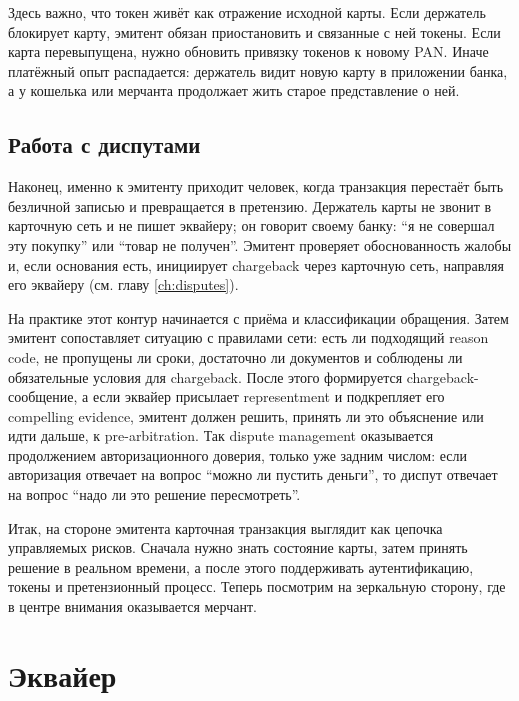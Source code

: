 Здесь важно, что токен живёт как отражение исходной карты.
Если держатель блокирует карту, эмитент обязан
приостановить и связанные с ней токены. Если карта перевыпущена,
нужно обновить привязку токенов к новому PAN. Иначе платёжный
опыт распадается: держатель видит новую карту в приложении банка,
а у кошелька или мерчанта продолжает жить старое представление
о ней.\cite{emvco-payment-tokenisation,visa-vts}

\subsection*{Работа с диспутами}

Наконец, именно к эмитенту приходит человек, когда транзакция
перестаёт быть безличной записью и превращается в претензию.
Держатель карты не звонит в карточную сеть и не пишет эквайеру;
он говорит своему банку: \enquote{я не совершал эту покупку}
или \enquote{товар не получен}. Эмитент проверяет обоснованность
жалобы и, если основания есть, инициирует chargeback через
карточную сеть, направляя его эквайеру
(см. главу \ref{ch:disputes}).\cite{visa-dispute-rules,mc-chargeback-guide,visa-vcr-merchants}

На практике этот контур начинается с приёма и классификации
обращения. Затем эмитент сопоставляет ситуацию с правилами сети:
есть ли подходящий reason code, не пропущены ли сроки, достаточно
ли документов и соблюдены ли обязательные условия для chargeback.
После этого формируется chargeback-сообщение, а если эквайер
присылает representment и подкрепляет его compelling evidence,
эмитент должен решить, принять ли это объяснение или идти дальше,
к pre-arbitration. Так dispute management оказывается продолжением
авторизационного доверия, только уже задним числом: если
авторизация отвечает на вопрос \enquote{можно ли пустить деньги},
то диспут отвечает на вопрос \enquote{надо ли это решение
пересмотреть}.\cite{visa-dispute-rules,mc-chargeback-guide,visa-vcr-merchants}

Итак, на стороне эмитента карточная транзакция выглядит как
цепочка управляемых рисков. Сначала нужно знать состояние карты,
затем принять решение в реальном времени, а после этого
поддерживать аутентификацию, токены и претензионный процесс.
Теперь посмотрим на зеркальную сторону, где в центре внимания
оказывается мерчант.

\section{Эквайер}
\label{sec:ia-acquirer}

